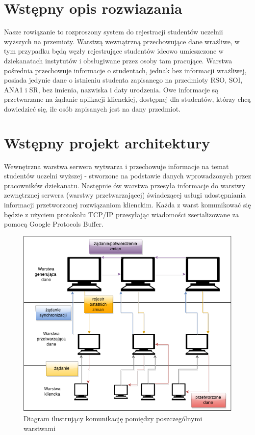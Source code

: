 \section[Wstępny opis rozwiązania]{Wstępny opis rozwiazania}

\par{Nasze rowiązanie to rozproszony system do rejestracji studentów uczelnii wyższych na przemioty. Warstwą wewnątrzną przechowujące dane wrażliwe, w tym przypadku będą węzły rejestrujące studentów ideowo umieszczone w dziekanatach instytutów i obsługiwane przez osoby tam pracujące. Warstwa pośrednia przechowuje informacje o studentach, jednak bez informacji wrażliwej, posiada jedynie dane o istnieniu studenta zapisanego na przedmioty RSO, SOI, ANA1 i SR,  bez imienia, nazwiska i daty urodzenia. Owe informacje są przetwarzane na żądanie aplikacji klienckiej, dostępnej dla studentów, którzy chcą dowiedzieć się, ile osób zapisanych jest na dany przedmiot.}

\section[Wstępny projekt architektury]{Wstępny projekt architektury}

\par{Wewnętrzna warstwa serwera wytwarza i przechowuje informacje na temat studentów uczelni wyższej - stworzone na podstawie danych wprowadzonych przez pracowników dziekanatu. Następnie ów warstwa przesyła informacje do warstwy zewnętrznej serwera (warstwy przetwarzającej) świadczącej usługi udostępniania informacji przetworzonej rozwiązaniom klienckim. Każda z warst komunikować się będzie z użyciem protokołu TCP/IP przesyłając wiadomości zserializowane za pomocą Google Protocols Buffer.}

\begin{figure}[h]
\begin{center}
\includegraphics[width=0.9\linewidth]{img/dane_net.png} 
\caption{Diagram ilustrujący komunikację pomiędzy poszczególnymi warstwami}
\label{img:dane_net}
\end{center}
\end{figure}

